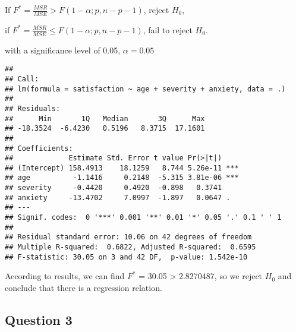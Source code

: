 \documentclass[]{article}
\newenvironment{Shaded}{\begin{snugshade}}{\end{snugshade}}
\newcommand{\KeywordTok}[1]{\textcolor[rgb]{0.13,0.29,0.53}{\textbf{#1}}}
\newcommand{\DataTypeTok}[1]{\textcolor[rgb]{0.13,0.29,0.53}{#1}}
\newcommand{\StringTok}[1]{\textcolor[rgb]{0.31,0.60,0.02}{#1}}
\newcommand{\OperatorTok}[1]{\textcolor[rgb]{0.81,0.36,0.00}{\textbf{#1}}}
\newcommand{\NormalTok}[1]{#1}
\begin{document}
If \(F^* = \frac{MSR}{MSE} > F(1-\alpha;p,n-p-1)\), reject \(H_0\),

if \(F^* = \frac{MSR}{MSE} \leq F(1-\alpha;p,n-p-1)\), fail to reject
\(H_0\).

with a significance level of 0.05, \(\alpha = 0.05\)

\begin{Shaded}
\end{Shaded}

\begin{verbatim}
## 
## Call:
## lm(formula = satisfaction ~ age + severity + anxiety, data = .)
## 
## Residuals:
##      Min       1Q   Median       3Q      Max 
## -18.3524  -6.4230   0.5196   8.3715  17.1601 
## 
## Coefficients:
##             Estimate Std. Error t value Pr(>|t|)    
## (Intercept) 158.4913    18.1259   8.744 5.26e-11 ***
## age          -1.1416     0.2148  -5.315 3.81e-06 ***
## severity     -0.4420     0.4920  -0.898   0.3741    
## anxiety     -13.4702     7.0997  -1.897   0.0647 .  
## ---
## Signif. codes:  0 '***' 0.001 '**' 0.01 '*' 0.05 '.' 0.1 ' ' 1
## 
## Residual standard error: 10.06 on 42 degrees of freedom
## Multiple R-squared:  0.6822, Adjusted R-squared:  0.6595 
## F-statistic: 30.05 on 3 and 42 DF,  p-value: 1.542e-10
\end{verbatim}

According to results, we can find \(F^*\) = 30.05 \textgreater{}
2.8270487, so we reject \(H_0\) and conclude that there is a regression
relation.

\subsection{Question 3}\label{question-3-2}

\begin{Shaded}
\end{Shaded}
\end{document}
